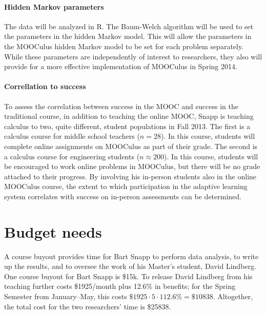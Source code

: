 \documentclass[12pt]{article}
\begin{document}
\paragraph{Hidden Markov parameters}

The data will be analyzed in R. The Baum-Welch algorithm will be used
to set the parameters in the hidden Markov model. This will allow the
parameters in the MOOCulus hidden Markov model to be set for each
problem separately. While these parameters are independently of
interest to researchers, they also will provide for a more effective
implementation of MOOCulus in Spring 2014.

\paragraph{Correllation to success}

To assess the correlation between success in the MOOC and success in
the traditional course, in addition to teaching the online MOOC, Snapp
is teaching calculus to two, quite different, student populations in
Fall 2013.  The first is a calculus course for middle school teachers
($n=28$). In this course, students will complete online assignments on
MOOCulus as part of their grade.  The second is a calculus course for
engineering students ($n\approx 200$).  In this course, students will
be encouraged to work online problems in MOOCulus, but there will be
no grade attached to their progress.  By involving his in-person
students also in the online MOOCulus course, the extent to which
participation in the adaptive learning system correlates with success
on in-person assessments can be determined.




\section{Budget needs}

A course buyout provides time for Bart Snapp to perform data analysis,
to write up the results, and to oversee the work of his Master's
student, David Lindberg.  One course buyout for Bart Snapp is \$15k.
To release David Lindberg from his teaching further costs \$1925/month
plus 12.6\% in benefits; for the Spring Semester from January--May,
this costs $\$1925 \cdot 5 \cdot 112.6\% = \$10838$.  Altogether, the
total cost for the two researchers' time is \$25838.

\printbibliography
\end{document}
